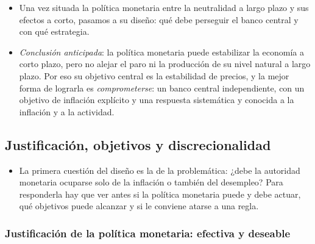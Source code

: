 \documentclass[11pt]{article}
\begin{document}
\begin{itemize}
\item Una vez situada la política monetaria entre la neutralidad a largo plazo y sus efectos a corto, pasamos a su diseño: qué debe perseguir el banco central y con qué estrategia.
\item \emph{Conclusión anticipada}: la política monetaria puede estabilizar la economía a corto plazo, pero no alejar el paro ni la producción de su nivel natural a largo plazo. Por eso su objetivo central es la estabilidad de precios, y la mejor forma de lograrla es \emph{comprometerse}: un banco central independiente, con un objetivo de inflación explícito y una respuesta sistemática y conocida a la inflación y a la actividad.
\end{itemize}

\subsection{Justificación, objetivos y discrecionalidad}\label{sec:justificacion-objetivos}

\begin{itemize}
\item La primera cuestión del diseño es la de la problemática: ¿debe la autoridad monetaria ocuparse solo de la inflación o también del desempleo? Para responderla hay que ver antes si la política monetaria puede y debe actuar, qué objetivos puede alcanzar y si le conviene atarse a una regla.
\end{itemize}

\subsubsection{Justificación de la política monetaria: efectiva y deseable}\label{sec:justificacion}
\end{document}
